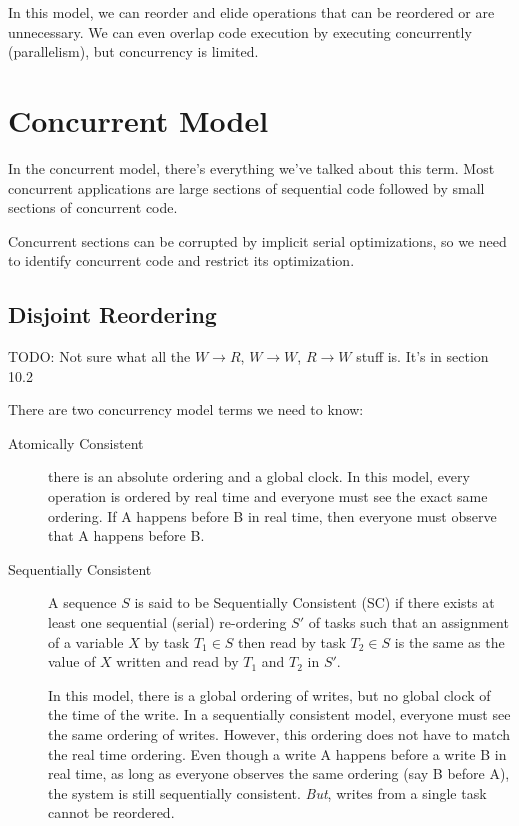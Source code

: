             In this model, we can reorder and elide operations that can be reordered or are unnecessary.
            We can even overlap code execution by executing concurrently (parallelism), but concurrency is limited.
        \section{Concurrent Model} %
        \label{sec:concurrent_model}
            In the concurrent model, there's everything we've talked about this term.
            Most concurrent applications are large sections of sequential code followed by small sections of concurrent code.

            Concurrent sections can be corrupted by implicit serial optimizations, so we need to identify concurrent code and restrict its optimization.
            \subsection{Disjoint Reordering} %
            \label{sub:disjoint_reordering}
                TODO: Not sure what all the $W \to R$, $W \to W$, $R \to W$ stuff is. It's in section 10.2

                There are two concurrency model terms we need to know:
                \begin{description}
                    \item[Atomically Consistent] there is an absolute ordering and a global clock.
                        In this model, every operation is ordered by real time and everyone must see the exact same ordering.
                        If A happens before B in real time, then everyone must observe that A happens before B.
                    \item[Sequentially Consistent]
                        A sequence $S$ is said to be Sequentially Consistent (SC) if there exists at least one sequential (serial) re-ordering $S'$ of tasks such that an assignment of a variable $X$ by task $T_1 \in S$ then read by task $T_2 \in S$ is the same as the value of $X$ written and read by $T_1$ and $T_2$ in $S'$.

                        In this model, there is a global ordering of writes, but no global clock of the time of the write.
                        In a sequentially consistent model, everyone must see the same ordering of writes.
                        However, this ordering does not have to match the real time ordering.
                        Even though a write A happens before a write B in real time, as long as everyone observes the same ordering (say B before A), the system is still sequentially consistent.
                        \textit{But}, writes from a single task cannot be reordered.
                \end{description}
